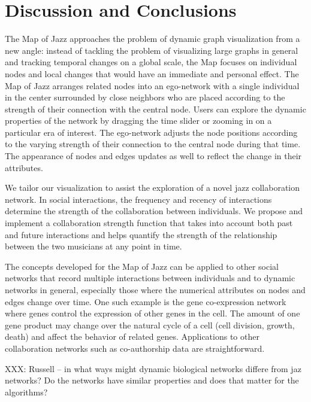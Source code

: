 \documentclass[12pt]{cmuthesis}
\begin{document}
\section{Discussion and Conclusions}

  The Map of Jazz approaches the problem of dynamic graph visualization from a new angle: instead of tackling the problem of visualizing large graphs in general and tracking temporal changes on a global scale, the Map focuses on individual nodes and local changes that would have an immediate and personal effect. The Map of Jazz arranges related nodes into an ego-network with a single individual in the center surrounded by close neighbors who are placed according to the strength of their connection with the central node. Users can explore the dynamic properties of the network by dragging the time slider or zooming in on a particular era of interest. The ego-network adjusts the node positions according to the varying strength of their connection to the central node during that time. The appearance of nodes and edges updates as well to reflect the change in their attributes.

  We tailor our visualization to assist the exploration of a novel jazz collaboration network. In social interactions, the frequency and recency of interactions determine the strength of the collaboration between individuals. We propose and implement a collaboration strength function that takes into account both past and future interactions and helps quantify the strength of the relationship between the two musicians at any point in time.

  The concepts developed for the Map of Jazz can be applied to other social networks that record multiple interactions between individuals and to dynamic networks in general, especially those where the numerical attributes on nodes and edges change over time. One such example is the gene co-expression network where genes control the expression of other genes in the cell. The amount of one gene product may change over the natural cycle of a cell (cell division, growth, death) and affect the behavior of related genes. Applications to other collaboration networks such as co-authorship data are straightforward.


  XXX: Russell -- in what ways might dynamic biological networks differe from jaz networks? Do the networks have similar properties and does that matter for the algorithms?
\end{document}
